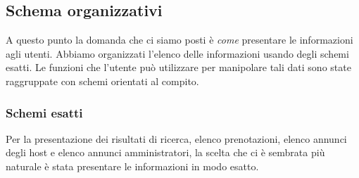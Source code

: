 \documentclass[1_relazione.tex]{subfiles}
\begin{document}
\subsection{Schema organizzativi}
A questo punto la domanda che ci siamo posti è \textit{come} presentare le informazioni agli utenti. Abbiamo organizzati l'elenco delle informazioni usando degli schemi esatti. Le funzioni che l'utente può utilizzare per manipolare tali dati sono state raggruppate con schemi orientati al compito.

\subsubsection{Schemi esatti}
Per la presentazione dei risultati di ricerca, elenco prenotazioni,  elenco annunci degli host e elenco annunci amministratori, la scelta che ci è sembrata più naturale è stata presentare le informazioni in modo esatto. 
\end{document}
